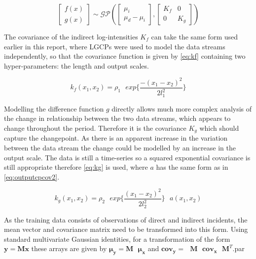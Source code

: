 \documentclass[a4paper,11pt]{report}
\begin{document}
\begin{equation} \label{eq:ccpfandg}
\left[ \begin{array}{cc}
f(x)  \\
g(x) \end{array} \right] \sim \mathcal{G}\mathcal{P} \left( \left[ \begin{array}{cc}
\mu_i  \\
\mu_d - \mu_i \end{array} \right], \left[ \begin{array}{cc}
K_f & 0  \\
0  & K_g \end{array} \right] \right)
\end{equation}

The covariance of the indirect log-intensities \(K_f\) can take the same form used earlier in this report, where LGCPs were used to model the data streams independently, so that the covariance function is given by \ref{eq:kf} containing two hyper-parameters: the length and output scales. 

\begin{equation} \label{eq:kf}
k_f(x_1,x_2) = \rho_1 \text{ }exp\{\frac{-(x_1-x_2)^2}{2 l_1^2}\}
\end{equation}

Modelling the difference function \(g\) directly allows much more complex analysis of the change in relationship between the two data streams, which appears to change throughout the period. Therefore it is the covariance \(K_g\) which should capture the changepoint. As there is an apparent increase in the variation between the data stream the change could be modelled by an increase in the output scale. The data is still a time-series so a squared exponential covariance is still appropriate therefore \ref{eq:kg} is used, where \(a\) has the same form as in \ref{eq:outputcpcov2}.

\begin{equation} \label{eq:kg}
k_g(x_1,x_2) = \rho_2 \text{ }exp\{\frac{(x_1-x_2)^2}{2 l_2^2}\} \text{ } a(x_1,x_2)
\end{equation}


As the training data consists of observations of direct and indirect incidents, the mean vector and covariance matrix need to be transformed into this form. Using standard multivariate Gaussian identities, for a transformation of the form \(\mathbf{y}= \mathbf{M} \mathbf{x}\) these arrays are given by \(\boldsymbol{\mu_y}= \mathbf{M}\text{ }\boldsymbol{\mu_x}\) and \(\mathbf{cov_y}= \text{ }\mathbf{M}\text{ } \mathbf{cov_x} \text{ } \mathbf{M}^{T}\).par
\end{document}
